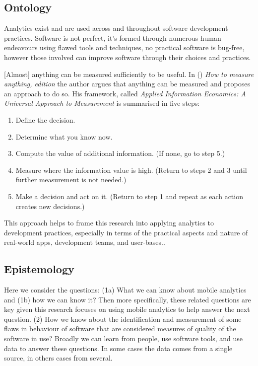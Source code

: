 \subsection{Ontology}
Analytics exist and are used across and throughout software development practices. Software is not perfect, it's formed through numerous human endeavours using flawed tools and techniques, no practical software is bug-free, however those involved can improve software through their choices and practices.

[Almost] anything can be measured sufficiently to be useful. In (\cite{hubbard2014measure}) \emph{How to measure anything,  edition} the author argues that anything can be measured and proposes an approach to do so. His framework, called \emph{Applied Information Economics: A Universal Approach to Measurement} is summarised in five steps:

\begin{enumerate}
    \item Define the decision.
    \item Determine what you know now.
    \item Compute the value of additional information. (If none, go to step 5.)
    \item Measure where the information value is high. (Return to steps 2 and 3 until further measurement is not needed.)
    \item Make a decision and act on it. (Return to step 1 and repeat as each action creates new decisions.)
\end{enumerate} %

This approach helps to frame this research into applying analytics to development practices, especially in terms of the practical aspects and nature of real-world apps, development teams, and user-bases..

\subsection{Epistemology}
Here we consider the questions: (1a) What we can know about mobile analytics and (1b) how we can know it? Then more specifically, these related questions are key given this research focuses on using mobile analytics to help answer the next question. (2) How we know about the identification and measurement of some flaws in behaviour of software that are considered measures of quality of the software in use? Broadly we can learn from people, use software tools, and use data to answer these questions. In some cases the data comes from a single source, in others cases from several.

